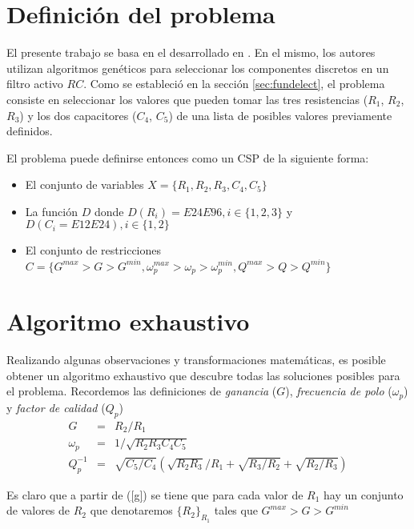 \documentclass{llncs}
\begin{document}
    
  \section{\textbf{Definici\'on del problema}}
    \label{sec:problemdefinition}
    El presente trabajo se basa en el desarrollado en \cite{lov:rom:per}. En el mismo, los autores
    utilizan algoritmos gen\'eticos para seleccionar los componentes discretos en un filtro activo $RC$. Como se
    estableci\'o en la secci\'on \ref{sec:fundelect}, el problema consiste en seleccionar los valores que pueden
    tomar las tres resistencias ($R_1$, $R_2$, $R_3$) y los dos capacitores ($C_4$, $C_5$) de una lista de posibles valores
    previamente definidos.
    
	El problema puede definirse entonces como un CSP de la siguiente forma:
	\begin{itemize}
		\item El conjunto de variables $X = \{R_1, R_2, R_3, C_4, C_5\}$
		\item La funci\'on $D$ donde $D(R_i) = E24  E96, i \in \{1,2,3\}$ y $D(C_i = E12 E24), i \in \{1,2\}$
		\item El conjunto de restricciones $C = \{G^{max} > G > G^{min}, \omega_p^{max} > \omega_p > \omega_p^{min},
		 Q^{max} > Q > Q^{min}\}$
	\end{itemize}

  \section{\textbf{Algoritmo exhaustivo}}
    Realizando algunas observaciones y transformaciones matem\'aticas, es posible obtener un algoritmo exhaustivo que descubre
    todas las soluciones posibles para el problema. Recordemos las definiciones
    de \textit{ganancia} ($G$), \textit{frecuencia de polo} ($\omega_p$) y
    \textit{factor de calidad} ($Q_p$)
    \begin{eqnarray}
      G &=& R_2/R_1 \label{g}\\
      \omega_p &=& 1/\sqrt{R_2 R_3 C_4 C_5} \label{omega}\\
      Q^{-1}_p &=& \sqrt{C_5/C_4}  \left(\sqrt{R_2 R_3}/R_1 + \sqrt{R_3/R_2} +
      \sqrt{R_2/R_3}\right) \label{q}
    \end{eqnarray}

    Es claro que a partir de (\ref{g}) se tiene que para cada valor de $R_1$ hay
    un conjunto de valores de $R_2$ que denotaremos 
    $\{R_2\}_{R_1}$ tales que $G^{max} > G > G^{min}$
\end{document}

